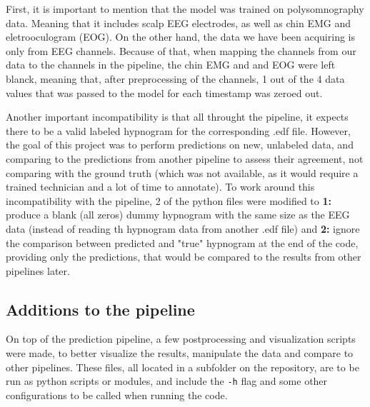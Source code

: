 First, it is important to mention that the model was trained on polysomnography data. Meaning that it includes scalp EEG electrodes, as well as chin EMG and eletrooculogram (EOG). On the other hand, the data we have been acquiring is only from EEG channels.
Because of that, when mapping the channels from our data to the channels in the pipeline, the chin EMG and and EOG were left blanck, meaning that, after preprocessing of the channels, 1 out of the 4 data values that was passed to the model for each timestamp was zeroed out. 

Another important incompatibility is that all throught the pipeline, it expects there to be a valid labeled hypnogram for the corresponding .edf file. However, the goal of this project was to perform predictions on new, unlabeled data, and comparing to the predictions from another pipeline to assess their agreement, not comparing with the ground truth (which was not available, as it would require a trained technician and a lot of time to annotate).
To work around this incompatibility with the pipeline, 2 of the python files were modified to \textbf{1:} produce a blank (all zeros) dummy hypnogram with the same size as the EEG data (instead of reading th hypnogram data from another .edf file) and \textbf{2:} ignore the comparison between predicted and "true" hypnogram at the end of the code, providing only the predictions, that would be compared to the results from other pipelines later.



\subsection{Additions to the pipeline} %
On top of the prediction pipeline, a few postprocessing and visualization scripts were made, to better visualize the results, manipulate the data and compare to other pipelines. These files, all located in a subfolder on the repository, are to be run as python scripts or modules, and include the \texttt{-h} flag and some other configurations to be called when running the code.

